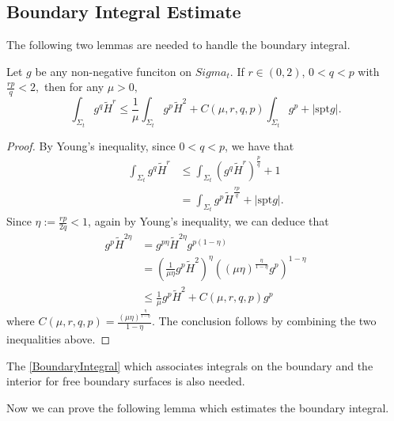 \subsection{Boundary Integral Estimate}

The following two lemmas are needed to handle the boundary integral.

\begin{lemma}\label{HSquare}
    Let $g$ be any non-negative funciton on $Sigma_t.$ If $r \in (0,2)$, $0<q<p$ with $\frac{rp }{q}<2,$ then for any $\mu >0,$ 
    \[
        \int_{\Sigma_t} g^q \tilde{H}^r \leq \frac{1}{\mu }\int_{\Sigma_t} g^p \tilde{H}^2+C(\mu ,r,q,p )\int_{\Sigma_t} g^p + \left| \mathrm{spt } g \right|.    
    \]
\end{lemma}
\begin{proof}
    By Young's inequality, since $0<q<p$, we have that 
    \begin{equation}
    \begin{split}
        \int_{\Sigma_t} g^q \tilde{H}^r 
    &\leq \int_{\Sigma_t} (g^q \tilde{H}^r)^{\frac{p}{q}}+1  \\
    &= \int_{\Sigma_t} g^p \tilde{H}^{\frac{rp }{q}}+\left| \mathrm{spt } g \right|.
    \end{split}
    \end{equation} 
    Since $\eta := \frac{rp }{2q}<1$, again by Young's inequality, we can deduce that
    \begin{equation}
    \begin{split}
        g^p \tilde{H}^{2\eta} 
    &= g^{p \eta }\tilde{H}^{2\eta}g^{p \left( 1-\eta \right) } \\
    &= \left( \frac{1}{\mu \eta  }g^{p}\tilde{H}^2 \right) ^{\eta} \left( (\mu \eta )^{\frac{\eta}{1-\eta } }g^p\right)^{1-\eta }\\
    & \leq \frac{1}{\mu }g^p\tilde{H}^2+C(\mu ,r,q,p)g^p
    \end{split}
    \end{equation} 
    where $C(\mu ,r,q,p)=\frac{(\mu \eta )^{\frac{\eta}{1-\eta } }}{1-\eta }$.
    The conclusion follows by combining the two inequalities above.
\end{proof}

The \autoref{BoundaryIntegral} which associates integrals on the boundary and the interior for free boundary surfaces is also needed.

Now we can prove the following lemma which estimates the boundary integral.

